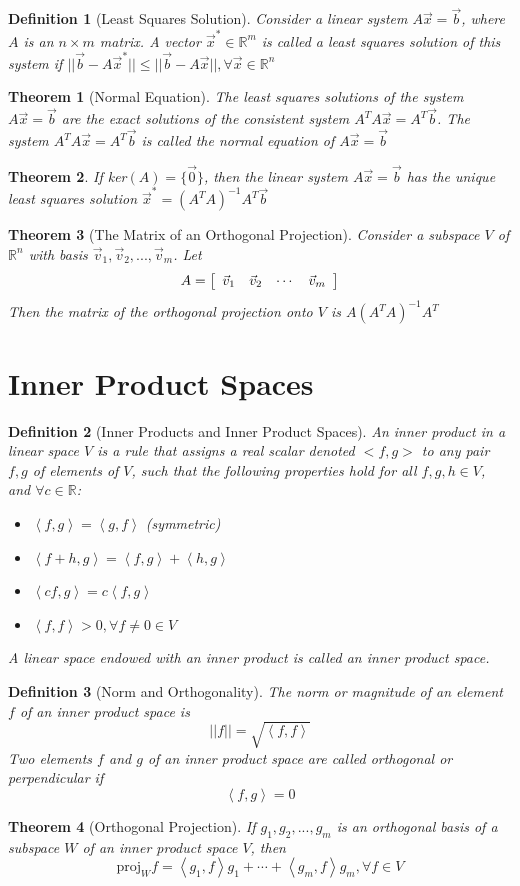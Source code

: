 \documentclass[10pt]{report}
\newtheorem{thm2}{Theorem}[section]
\newtheorem{def2}{Definition}[section]
\begin{document}
\begin{def2}[Least Squares Solution]
Consider a linear system $A\vec{x} = \vec{b}$, where $A$ is an $n\times m$ matrix. A vector $\vec{x}^*\in \mathbb{R}^m$ is called a least squares solution of this system if $||\vec{b}-A\vec{x}^*||\leq ||\vec{b}-A\vec{x}||,\forall \vec{x} \in \mathbb{R}^n$
\end{def2}
\begin{thm2}[Normal Equation]
The least squares solutions of the system $A\vec{x}=\vec{b}$ are the exact solutions of the consistent system $A^TA\vec{x}=A^T\vec{b}$. The system $A^TA\vec{x}=A^T\vec{b}$ is called the normal equation of $A\vec{x}=\vec{b}$
\end{thm2}
\begin{thm2}
If ker$(A)=\{\vec{0}\}$, then the linear system $A\vec{x}=\vec{b}$ has the unique least squares solution $\vec{x}^* = (A^TA)^{-1}A^T\vec{b}$
\end{thm2}
\begin{thm2}[The Matrix of an Orthogonal Projection]
Consider a subspace $V$ of $\mathbb{R}^n$ with basis $\vec{v}_1, \vec{v}_2, ...,\vec{v}_m$. Let
$$A = \left[\begin{array}{c c c c}
\vec{v}_1 & \vec{v}_2 & \cdots & \vec{v}_m
\end{array}\right]$$
Then the matrix of the orthogonal projection onto $V$ is $A(A^TA)^{-1}A^T$
\end{thm2}

\section{Inner Product Spaces}
\begin{def2}[Inner Products and Inner Product Spaces]
An inner product in a linear space $V$ is a rule that assigns a real scalar denoted $<f,g>$ to any pair $f,g$ of elements of $V$, such that the following properties hold for all $f,g,h\in V$, and $\forall c\in \mathbb{R}$:
\begin{itemize}
\item[a.] $\left<f,g\right> = \left<g,f\right>$ (symmetric)
\item[b.] $\left<f+h,g\right> = \left<f,g\right> + \left<h,g\right>$
\item[c.] $\left<cf,g\right> = c\left<f,g\right>$
\item[d.] $\left<f,f\right> > 0, \forall f\neq 0 \in V$
\end{itemize}
A linear space endowed with an inner product is called an inner product space.
\end{def2}
\begin{def2}[Norm and Orthogonality]
The norm or magnitude of an element $f$ of an inner product space is
$$||f||=\sqrt{\left<f,f\right>}$$
Two elements $f$ and $g$ of an inner product space are called orthogonal or perpendicular if
$$\left<f,g\right>=0$$
\end{def2}
\begin{thm2}[Orthogonal Projection]
If $g_1, g_2, ...,g_m$ is an orthogonal basis of a subspace $W$ of an inner product space $V$, then
$$\text{proj}_Wf = \left<g_1,f\right>g_1 + \cdots + \left<g_m,f\right>g_m, \forall f\in V$$
\end{thm2}
\end{document}
